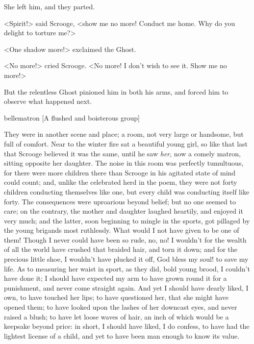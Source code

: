She left him, and they parted.

<Spirit!> said Scrooge, <show me no more! Conduct me home. Why do you delight to
torture me?>

<One shadow more!> exclaimed the Ghost.

<No more!> cried Scrooge. <No more! I don't wish to see it. Show me no more!>

But the relentless Ghost pinioned him in both his arms, and forced him to
observe what happened next.

  \begin{colorbigpic}
    [\basicscale] 
    {bellematron}
    [A flushed and boisterous group]
  \end{colorbigpic}


They were in another scene and place; a room, not very large or handsome, but
full of comfort. Near to the winter fire sat a beautiful young girl, so like
that last that Scrooge believed it was the same, until he saw \emph{her}, now a
comely matron, sitting opposite her daughter. The noise in this room was
perfectly tumultuous, for there were more children there than Scrooge in his
agitated state of mind could count; and, unlike the celebrated herd in the poem,
they were not forty children conducting themselves like one, but every child was
conducting itself like forty. The consequences were uproarious beyond belief;
but no one seemed to care; on the contrary, the mother and daughter laughed
heartily, and enjoyed it very much; and the latter, soon beginning to mingle in
the sports, got pillaged by the young brigands most ruthlessly. What would I not
have given to be one of them! Though I never could have been so rude, no, no! I
wouldn't for the wealth of all the world have crushed that braided hair, and
torn it down; and for the precious little shoe, I wouldn't have plucked it off,
God bless my soul! to save my life. As to measuring her waist in sport, as they
did, bold young brood, I couldn't have done it; I should have expected my arm to
have grown round it for a punishment, and never come straight again. And yet I
should have dearly liked, I own, to have touched her lips; to have questioned
her, that she might have opened them; to have looked upon the lashes of her
downcast eyes, and never raised a blush; to have let loose waves of hair, an
inch of which would be a keepsake beyond price: in short, I should have liked, I
do confess, to have had the lightest license of a child, and yet to have been
man enough to know its value.

